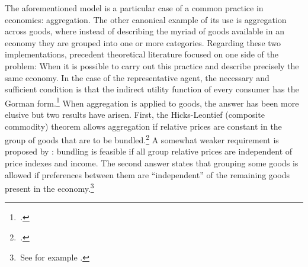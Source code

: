 \documentclass[english, a4paper, 12pt]{article}
\begin{document}
The aforementioned model is a particular case of a common practice in economics: aggregation. The other canonical example of its use is aggregation across goods, where instead of describing the myriad of goods available in an economy they are grouped into one or more categories. Regarding these two implementations, precedent theoretical literature focused on one side of the problem: When it is possible to carry out this practice and describe precisely the same economy. In the case of the representative agent, the necessary and sufficient condition is that the indirect utility function of every consumer has the Gorman form.\footnote{\,\cite{Gorman53}.} When aggregation is applied to goods, the answer has been more elusive but two results have arisen. First, the Hicks-Leontief (composite commodity) theorem allows aggregation if relative prices are constant in the group of goods that are to be bundled.\footnote{\,\cite{Leontief36, HicksBook}.} A somewhat weaker requirement is proposed by \cite{Lewbel96}: bundling is feasible if all group relative prices are independent of price indexes and income. The second answer states that grouping some goods is allowed if preferences between them are ``independent'' of the remaining goods present in the economy.\footnote{\,See for example \cite{GormanSeparability}.} 
\end{document}
